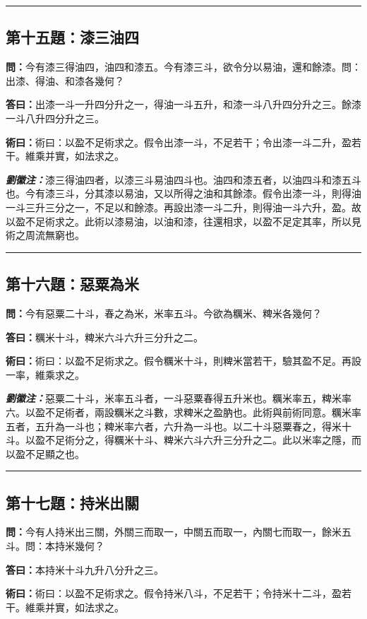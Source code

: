 \documentclass[11pt,a4paper]{article}
\newcommand{\wen}[1]{\textbf{\color{problemcolor}問：}#1\par}
\newcommand{\da}[1]{\textbf{答曰：}#1\par}
\newcommand{\shu}[1]{\textbf{術曰：}#1\par}
\newcommand{\liuhui}[1]{{\color{commentarycolor}\textit{\textbf{劉徽注：}}#1\par}}
\begin{document}
\bigskip
\hrule
\bigskip

\subsection{第十五題：漆三油四}

\wen{今有漆三得油四，油四和漆五。今有漆三斗，欲令分以易油，還和餘漆。問：出漆、得油、和漆各幾何？}

\da{出漆一斗一升四分升之一，得油一斗五升，和漆一斗八升四分升之三。餘漆一斗八升四分升之三。}

\shu{術曰：以盈不足術求之。假令出漆一斗，不足若干；令出漆一斗二升，盈若干。維乘并實，如法求之。}

\liuhui{漆三得油四者，以漆三斗易油四斗也。油四和漆五者，以油四斗和漆五斗也。今有漆三斗，分其漆以易油，又以所得之油和其餘漆。假令出漆一斗，則得油一斗三升三分之一，不足以和餘漆。再設出漆一斗二升，則得油一斗六升，盈。故以盈不足術求之。此術以漆易油，以油和漆，往還相求，以盈不足定其率，所以見術之周流無窮也。}

\bigskip
\hrule
\bigskip

\subsection{第十六題：惡粟為米}

\wen{今有惡粟二十斗，春之為米，米率五斗。今欲為糲米、粺米各幾何？}

\da{糲米十斗，粺米六斗六升三分升之二。}

\shu{術曰：以盈不足術求之。假令糲米十斗，則粺米當若干，驗其盈不足。再設一率，維乘求之。}

\liuhui{惡粟二十斗，米率五斗者，一斗惡粟春得五升米也。糲米率五，粺米率六。以盈不足術者，兩設糲米之斗數，求粺米之盈肭也。此術與前術同意。糲米率五者，五升為一斗也；粺米率六者，六升為一斗也。以二十斗惡粟春之，得米十斗。以盈不足術分之，得糲米十斗、粺米六斗六升三分升之二。此以米率之隱，而以盈不足顯之也。}

\bigskip
\hrule
\bigskip

\subsection{第十七題：持米出關}

\wen{今有人持米出三關，外關三而取一，中關五而取一，內關七而取一，餘米五斗。問：本持米幾何？}

\da{本持米十斗九升八分升之三。}

\shu{術曰：以盈不足術求之。假令持米八斗，不足若干；令持米十二斗，盈若干。維乘并實，如法求之。}
\end{document}
